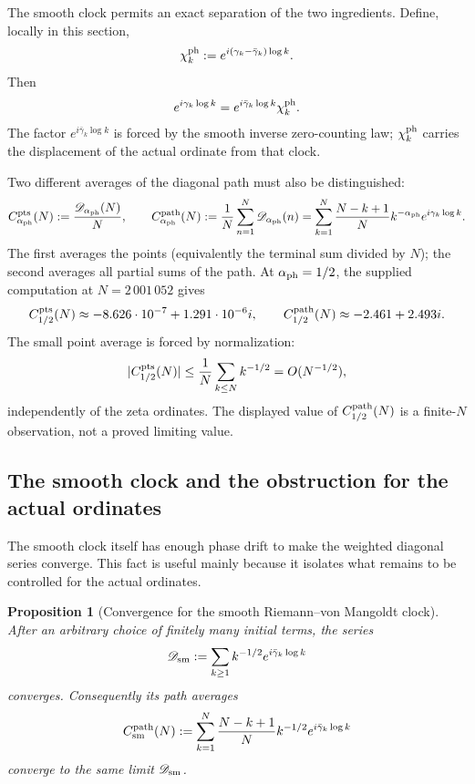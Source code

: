 \documentclass[11pt,reqno]{amsart}
\numberwithin{equation}{section}
\theoremstyle{plain}
\newtheorem{proposition}[theorem]{Proposition}
\theoremstyle{definition}
\theoremstyle{remark}
\begin{document}
The smooth clock permits an exact separation of the two ingredients. Define,
locally in this section,
\begin{equation}
\label{eq:diagonal-phase-fluctuation}
 \chi_k^{\rm ph}:=
 e^{i(\gamma_k-\bar\gamma_k)\log k}.
\end{equation}
Then
\begin{equation}
\label{eq:diagonal-smooth-fluctuation-factorization}
 e^{i\gamma_k\log k}
 =e^{i\bar\gamma_k\log k}\chi_k^{\rm ph}.
\end{equation}
The factor $e^{i\bar\gamma_k\log k}$ is forced by the smooth inverse
zero-counting law; $\chi_k^{\rm ph}$ carries the displacement of the actual
ordinate from that clock.

Two different averages of the diagonal path must also be distinguished:
\begin{equation}
\label{eq:diagonal-centroids}
 C_{\alpha_{\rm ph}}^{\rm pts}(N)
 :=\frac{\mathscr D_{\alpha_{\rm ph}}(N)}{N},\qquad
 C_{\alpha_{\rm ph}}^{\rm path}(N)
 :=\frac1N\sum_{n=1}^{N}\mathscr D_{\alpha_{\rm ph}}(n)
 =\sum_{k=1}^{N}\frac{N-k+1}{N}
   k^{-\alpha_{\rm ph}}e^{i\gamma_k\log k}.
\end{equation}
The first averages the points (equivalently the terminal sum divided by
$N$); the second averages all partial sums of the path. At
$\alpha_{\rm ph}=1/2$, the supplied computation at $N=2\,001\,052$ gives
\[
 C_{1/2}^{\rm pts}(N)\approx-8.626\cdot10^{-7}
 +1.291\cdot10^{-6}i,\qquad
 C_{1/2}^{\rm path}(N)\approx-2.461+2.493i.
\]
The small point average is forced by normalization:
\[
 |C_{1/2}^{\rm pts}(N)|\le \frac1N\sum_{k\le N}k^{-1/2}
 =O(N^{-1/2}),
\]
independently of the zeta ordinates. The displayed value of
$C_{1/2}^{\rm path}(N)$ is a finite-$N$ observation, not a proved limiting
value.

\subsection{The smooth clock and the obstruction for the actual ordinates}
\label{subsec:diagonal-smooth-clock}

The smooth clock itself has enough phase drift to make the weighted diagonal
series converge. This fact is useful mainly because it isolates what remains
to be controlled for the actual ordinates.

\begin{proposition}[Convergence for the smooth Riemann--von Mangoldt clock]
\label{prop:smooth-clock-convergence}
After an arbitrary choice of finitely many initial terms, the series
\begin{equation}
\label{eq:smooth-clock-series}
 \mathscr D_{\rm sm}
 :=\sum_{k\ge1}k^{-1/2}e^{i\bar\gamma_k\log k}
\end{equation}
converges. Consequently its path averages
\begin{equation}
\label{eq:smooth-clock-path-average}
 C_{\rm sm}^{\rm path}(N):=
 \sum_{k=1}^{N}\frac{N-k+1}{N}
 k^{-1/2}e^{i\bar\gamma_k\log k}
\end{equation}
converge to the same limit $\mathscr D_{\rm sm}$.
\end{proposition}
\end{document}
